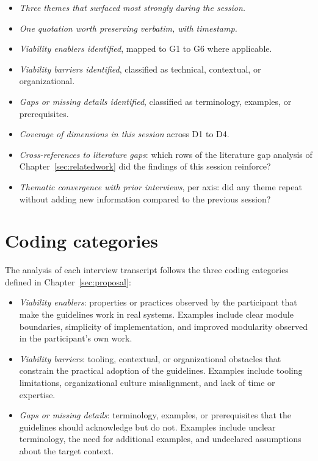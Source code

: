 \begin{itemize}[itemsep=4pt,topsep=2pt]
  \item \emph{Three themes that surfaced most strongly during the session.}
  \item \emph{One quotation worth preserving verbatim, with timestamp.}
  \item \emph{Viability enablers identified}, mapped to G1 to G6 where applicable.
  \item \emph{Viability barriers identified}, classified as technical, contextual, or organizational.
  \item \emph{Gaps or missing details identified}, classified as terminology, examples, or prerequisites.
  \item \emph{Coverage of dimensions in this session} across D1 to D4.
  \item \emph{Cross-references to literature gaps}: which rows of the literature gap analysis of Chapter~\ref{sec:relatedwork} did the findings of this session reinforce?
  \item \emph{Thematic convergence with prior interviews}, per axis: did any theme repeat without adding new information compared to the previous session?
\end{itemize}

\section*{Coding categories}

The analysis of each interview transcript follows the three coding categories defined in Chapter~\ref{sec:proposal}:

\begin{itemize}[itemsep=4pt,topsep=2pt]
  \item \emph{Viability enablers}: properties or practices observed by the participant that make the guidelines work in real systems. Examples include clear module boundaries, simplicity of implementation, and improved modularity observed in the participant's own work.
  \item \emph{Viability barriers}: tooling, contextual, or organizational obstacles that constrain the practical adoption of the guidelines. Examples include tooling limitations, organizational culture misalignment, and lack of time or expertise.
  \item \emph{Gaps or missing details}: terminology, examples, or prerequisites that the guidelines should acknowledge but do not. Examples include unclear terminology, the need for additional examples, and undeclared assumptions about the target context.
\end{itemize}

